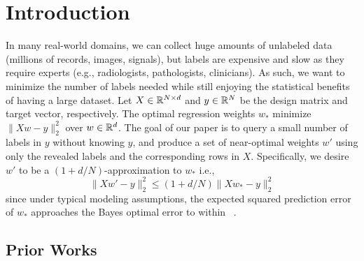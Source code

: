 \section{Introduction}

In many real-world domains, we can collect huge amounts of unlabeled data (millions of records, images, signals), but labels are expensive and slow as they require experts (e.g., radiologists, pathologists, clinicians). As such, we want to minimize the number of labels needed while still enjoying the statistical benefits of having a large dataset.  
Let $X \in \mathbb{R}^{N \times d}$ and \(y\in \mathbb{R}^{N}\) be the design
matrix and target vector, respectively. The optimal regression weights \(w_*\) minimize
\(\|X w-y\|_2^2\) over \(w\in\mathbb{R}^d\). The goal of our paper
is to query a small number of labels in $y$ without knowing
\(y\), and produce a set of near-optimal
weights $w'$ using only
the revealed labels and the corresponding rows in \(X\).
Specifically, we desire $w'$ to be a \((1+d/N)\)-approximation
to $w_*$ i.e.,
\begin{equation}
    \|X w' -y\|_2^2\le (1+d/N)\|X w_*-y\|_2^2
\end{equation}
since under typical modeling assumptions, the expected squared prediction error of $w_*$ approaches the Bayes optimal error to within 
~\cite[Chapter 3]{Mostafa2012}.




\subsection{Prior Works}

